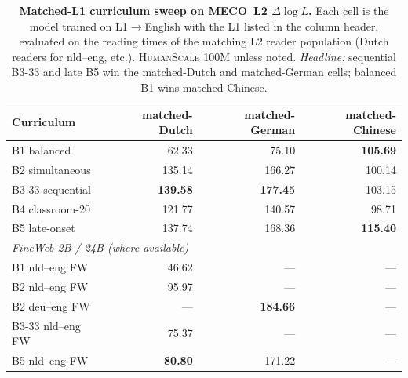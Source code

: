 \begin{table}[!ht]
  \centering
  \small
  \caption{\textbf{Matched-L1 \beetle{} curriculum sweep on MECO~L2 $\Delta\log L$.} Each cell is the model trained on L1$\to$English with the L1 listed in the column header, evaluated on the reading times of the matching L2 reader population (Dutch readers for nld--eng, etc.). \textsc{HumanScale} 100M unless noted. \emph{Headline:} sequential B3-33 and late B5 win the matched-Dutch and matched-German cells; balanced B1 wins matched-Chinese.}
  \label{tab:meco_curriculum_matched}
  \begin{tabular}{lrrr}
    \toprule
    Curriculum & matched-Dutch & matched-German & matched-Chinese \\
    \midrule
    B1 balanced       & 62.33  & 75.10  & \textbf{105.69} \\
    B2 simultaneous   & 135.14 & 166.27 & 100.14 \\
    B3-33 sequential  & \textbf{139.58} & \textbf{177.45} & 103.15 \\
    B4 classroom-20   & 121.77 & 140.57 & 98.71 \\
    B5 late-onset     & 137.74 & 168.36 & \textbf{115.40} \\
    \midrule
    \multicolumn{4}{l}{\textit{FineWeb 2B / 24B (where available)}} \\
    \midrule
    B1 nld--eng FW    & 46.62  & --- & --- \\
    B2 nld--eng FW    & 95.97  & --- & --- \\
    B2 deu--eng FW    & ---    & \textbf{184.66} & --- \\
    B3-33 nld--eng FW & 75.37  & --- & --- \\
    B5 nld--eng FW    & \textbf{80.80}  & 171.22 & --- \\
    \bottomrule
  \end{tabular}
\end{table}

